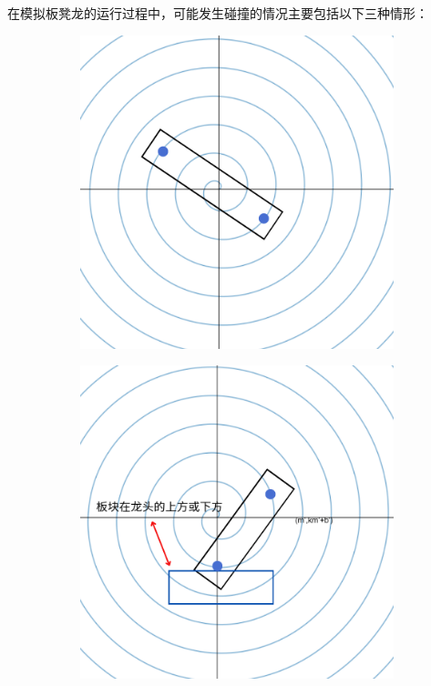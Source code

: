 \documentclass[withoutpreface,bwprint]{cumcmthesis}
\begin{document}
在模拟板凳龙的运行过程中，可能发生碰撞的情况主要包括以下三种情形\cite{ref2}：
\begin{figure}[htbp!]
	\centering
	\begin{subfigure}[t]{0.32\textwidth}
		\includegraphics[width=\textwidth]{pics/s22}
		\label{fig:cra1}
	\end{subfigure}
	\hfill
	\begin{subfigure}[t]{0.32\textwidth}
		\includegraphics[width=\textwidth]{pics/s23}

\end{subfigure}
\end{figure}
\end{document}
